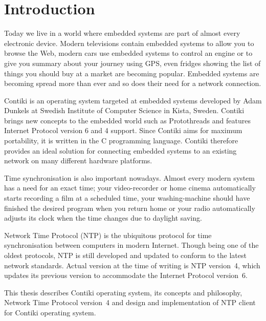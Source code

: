 
\chapter{Introduction}
Today we live in a world where embedded systems are part of almost every electronic device.
Modern televisions contain embedded systems to allow you to browse the Web,
modern cars use embedded systems to control an engine or to give you summary
about your journey using GPS, even fridges showing the list of things you should buy at a market are becoming popular.
Embedded systems are becoming spread more than ever and so does
their need for a network connection.

Contiki is an operating system targeted at embedded systems
developed by Adam Dunkels at Swedish Institute of Computer Science in Kista, Sweden.
Contiki brings new concepts to the embedded world such as Protothreads and features
Internet Protocol version 6 and 4 support.
Since Contiki aims for maximum portability, it is written in the C programming language.
Contiki therefore provides an ideal solution for connecting
embedded systems to an existing network on many different hardware platforms.

Time synchronisation is also important nowadays.
Almost every modern system has a need for an exact time;
your video-recorder or home cinema automatically starts recording a film at a scheduled time,
your washing-machine should have finished the
desired program when you return home or your radio automatically adjusts its clock when the time changes
due to daylight saving.

Network Time Protocol (NTP) is the ubiquitous protocol for time synchronisation between computers in modern Internet.
Though being one of the oldest protocols, NTP is still developed and updated to conform to the latest
network standards. Actual version at the time of writing is NTP version~4, which updates its previous version to
accommodate the Internet Protocol version~6.

This thesis describes Contiki operating system, its concepts and philosophy,
Network Time Protocol version~4 and design and implementation of NTP client for Contiki operating system.








